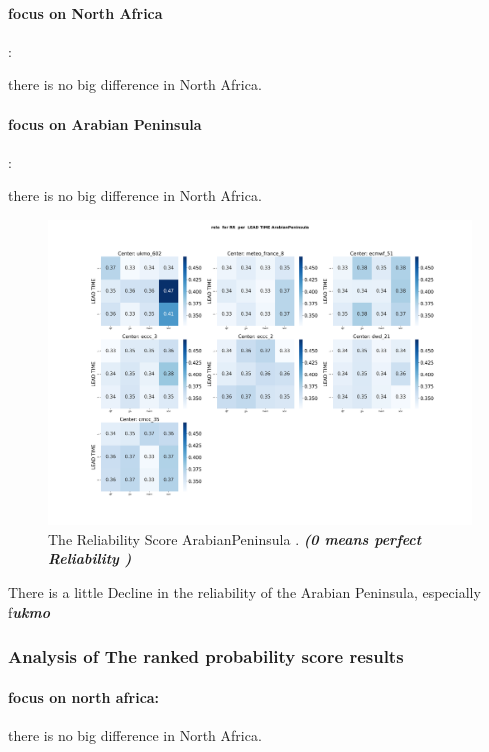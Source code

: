 \paragraph{focus on North Africa}:

there is no big difference in North Africa.

\paragraph{focus on Arabian Peninsula}:


there is no big difference in North Africa.



\begin{figure}[H]
    \centering
    \includegraphics[scale=0.25]{plots/prob/rela/rela_RR_ArabianPeninsula.png}
    \caption{The Reliability Score ArabianPeninsula . \textbf{\textit{(0 means perfect Reliability )}}}
\end{figure}

There is a little Decline in the reliability of the Arabian Peninsula, especially f\textbf{\textit{ukmo}}

\subsubsection{Analysis of The ranked probability score results}
\paragraph{focus on north africa:}

there is no big difference in North Africa.

